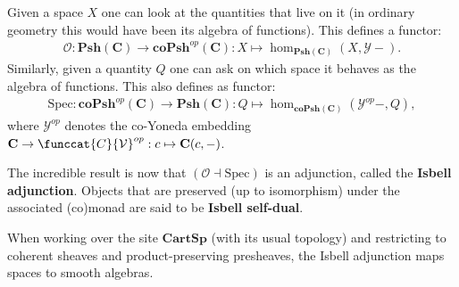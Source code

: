     \begin{property}
        Given a space $X$ one can look at the quantities that live on it (in ordinary geometry this would have been its algebra of functions). This defines a functor:
        \begin{gather}
            \mathcal{O}:\mathbf{Psh(C)}\rightarrow\mathbf{coPsh}^{op}(\mathbf{C}):X\mapsto\hom_\mathbf{Psh(C)}(X,\mathcal{Y}-).
        \end{gather}
        Similarly, given a quantity $Q$ one can ask on which space it behaves as the algebra of functions. This also defines as functor:
        \begin{gather}
            \mathrm{Spec}:\mathbf{coPsh}^{op}(\mathbf{C})\rightarrow\mathbf{Psh(C)}:Q\mapsto\hom_\mathbf{coPsh(C)}(\mathcal{Y}^{op}-,Q),
        \end{gather}
        where $\mathcal{Y}^{op}$ denotes the co-Yoneda embedding $\mathbf{C}\rightarrow\funccat{C}{\mathcal{V}}^{op}:c\mapsto\mathbf{C}(c,-)$.

        The incredible result is now that $(\mathcal{O}\dashv\text{Spec})$ is an adjunction, called the \textbf{Isbell adjunction}. Objects that are preserved (up to isomorphism) under the associated (co)monad are said to be \textbf{Isbell self-dual}.
    \end{property}
    \begin{example}
        When working over the site $\mathbf{CartSp}$ (with its usual topology) and restricting to coherent sheaves and product-preserving presheaves, the Isbell adjunction maps spaces to smooth algebras.
    \end{example}